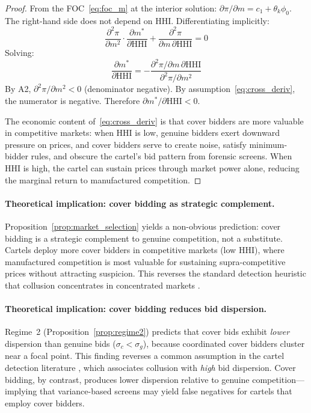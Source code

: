 \begin{proof}
From the FOC~\eqref{eq:foc_m} at the interior solution:
$\partial \pi / \partial m = c_1 + \theta_k \phi_0$. The right-hand
side does not depend on HHI. Differentiating implicitly:
\[
  \frac{\partial^2 \pi}{\partial m^2} \cdot
  \frac{\partial m^*}{\partial \text{HHI}}
  + \frac{\partial^2 \pi}{\partial m \, \partial \text{HHI}} = 0
\]
Solving:
\[
  \frac{\partial m^*}{\partial \text{HHI}} =
  -\frac{\partial^2 \pi / \partial m \, \partial \text{HHI}}
  {\partial^2 \pi / \partial m^2}
\]
By A2, $\partial^2 \pi / \partial m^2 < 0$ (denominator negative).
By assumption~\eqref{eq:cross_deriv}, the numerator is negative.
Therefore $\partial m^* / \partial \text{HHI} < 0$.

The economic content of~\eqref{eq:cross_deriv} is that cover bidders
are more valuable in competitive markets: when HHI is low, genuine
bidders exert downward pressure on prices, and cover bidders serve to
create noise, satisfy minimum-bidder rules, and obscure the cartel's
bid pattern from forensic screens. When HHI is high, the cartel can
sustain prices through market power alone, reducing the marginal return
to manufactured competition.
\end{proof}

\paragraph{Theoretical implication: cover bidding as strategic complement.}
Proposition~\ref{prop:market_selection} yields a non-obvious
prediction: cover bidding is a strategic complement to genuine
competition, not a substitute. Cartels deploy more cover bidders in
competitive markets (low HHI), where manufactured competition is most
valuable for sustaining supra-competitive prices without attracting
suspicion. This reverses the standard detection heuristic that
collusion concentrates in concentrated markets
\citep{marshall2012economics}.

\paragraph{Theoretical implication: cover bidding reduces bid dispersion.}
Regime~2 (Proposition~\ref{prop:regime2}) predicts that cover bids
exhibit \emph{lower} dispersion than genuine bids
($\sigma_c < \sigma_g$), because coordinated cover bidders cluster near
a focal point. This finding reverses a common assumption in the cartel
detection literature \citep{imhof2019detecting}, which associates
collusion with \emph{high} bid dispersion. Cover bidding, by contrast,
produces lower dispersion relative to genuine competition---implying
that variance-based screens may yield false negatives for cartels that
employ cover bidders.

